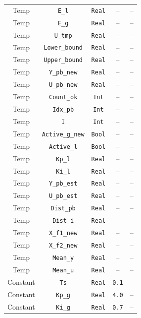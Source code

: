 \begin{table}[!p]
{\begin{tabular}{c c c c c}
    Temp & \texttt{E\_l} & \texttt{Real} & -- & -- \\ %
    Temp & \texttt{E\_g} & \texttt{Real} & -- & -- \\ %
    Temp & \texttt{U\_tmp} & \texttt{Real} & -- & -- \\ %
    Temp & \texttt{Lower\_bound} & \texttt{Real} & -- & -- \\ %
    Temp & \texttt{Upper\_bound} & \texttt{Real} & -- & -- \\ %
    Temp & \texttt{Y\_pb\_new} & \texttt{Real} & -- & -- \\ %
    Temp & \texttt{U\_pb\_new} & \texttt{Real} & -- & -- \\ %
    Temp & \texttt{Count\_ok} & \texttt{Int} & -- & -- \\ %
    Temp & \texttt{Idx\_pb} & \texttt{Int} & -- & -- \\ %
    Temp & \texttt{I} & \texttt{Int} & -- & -- \\ %
    Temp & \texttt{Active\_g\_new} & \texttt{Bool} & -- & -- \\ %
    Temp & \texttt{Active\_l} & \texttt{Bool} & -- & -- \\ %
    Temp & \texttt{Kp\_l} & \texttt{Real} & -- & -- \\ %
    Temp & \texttt{Ki\_l} & \texttt{Real} & -- & -- \\ %
    Temp & \texttt{Y\_pb\_est} & \texttt{Real} & -- & -- \\ %
    Temp & \texttt{U\_pb\_est} & \texttt{Real} & -- & -- \\ %
    Temp & \texttt{Dist\_pb} & \texttt{Real} & -- & -- \\ %
    Temp & \texttt{Dist\_i} & \texttt{Real} & -- & -- \\ %
    Temp & \texttt{X\_f1\_new} & \texttt{Real} & -- & -- \\ %
    Temp & \texttt{X\_f2\_new} & \texttt{Real} & -- & -- \\ %
    Temp & \texttt{Mean\_y} & \texttt{Real} & -- & -- \\ %
    Temp & \texttt{Mean\_u} & \texttt{Real} & -- & -- \\ %

    Constant & \texttt{Ts} & \texttt{Real} & \texttt{0.1} & -- \\ %
    Constant & \texttt{Kp\_g} & \texttt{Real} & \texttt{4.0} & -- \\ %
    Constant & \texttt{Ki\_g} & \texttt{Real} & \texttt{0.7} & -- \\ %
    \bottomrule
\end{tabular}
}

\vspace*{-2.0cm}
\end{table}

